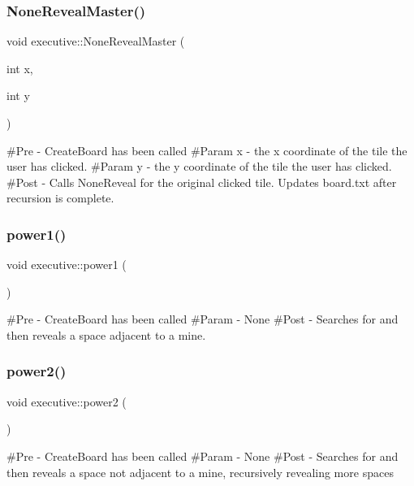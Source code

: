\subsubsection{\texorpdfstring{NoneRevealMaster()}{NoneRevealMaster()}}
{\footnotesize\ttfamily void executive\+::\+None\+Reveal\+Master (\begin{DoxyParamCaption}\item[{int}]{x,  }\item[{int}]{y }\end{DoxyParamCaption})}

\#\+Pre -\/ Create\+Board has been called \#\+Param x -\/ the x coordinate of the tile the user has clicked. \#\+Param y -\/ the y coordinate of the tile the user has clicked. \#\+Post -\/ Calls None\+Reveal for the original clicked tile. Updates board.\+txt after recursion is complete. \mbox{\label{classexecutive_a42eb5db1f682db14251d2887d862f075}} 
\subsubsection{\texorpdfstring{power1()}{power1()}}
{\footnotesize\ttfamily void executive\+::power1 (\begin{DoxyParamCaption}{ }\end{DoxyParamCaption})}

\#\+Pre -\/ Create\+Board has been called \#\+Param -\/ None \#\+Post -\/ Searches for and then reveals a space adjacent to a mine. \mbox{\label{classexecutive_a35756c3d850f7a5661fdebc6f577984c}} 
\subsubsection{\texorpdfstring{power2()}{power2()}}
{\footnotesize\ttfamily void executive\+::power2 (\begin{DoxyParamCaption}{ }\end{DoxyParamCaption})}

\#\+Pre -\/ Create\+Board has been called \#\+Param -\/ None \#\+Post -\/ Searches for and then reveals a space not adjacent to a mine, recursively revealing more spaces \mbox{\label{classexecutive_a7fa257166eeb08882c3fa85a7005508c}} 
